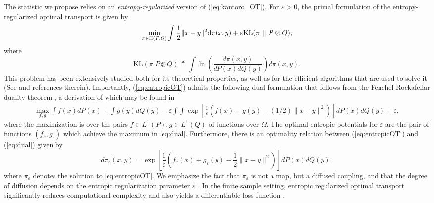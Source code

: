 \documentclass{article}
\theoremstyle{definition}
\newcommand{\feps}{f_\varepsilon}
\newcommand{\geps}{g_\varepsilon}
\begin{document}
The statistic we propose relies on an \textit{entropy-regularized} version of (\ref{eq:kantoro_OT}). For $\varepsilon>0$, the primal formulation of the entropy-regularized optimal transport is given by
\begin{equation}\label{eq:entropicOT}
    \min_{ \pi\in \Pi(P, Q)} \int \frac{1}{2}\|x-y\|^2 \text d\pi( x,  y) + \varepsilon \text{KL}( \pi \  || \ P \otimes Q),
\end{equation}
where
\begin{equation*}
    \text{KL}(\pi|P \otimes Q) \triangleq \int \ln \left ( \frac{d\pi( x, y)}{ dP(x) dQ( y)} \right ) d\pi( x, y).
\end{equation*}
This problem has been extensively studied both for its theoretical properties, as well as for the efficient algorithms that are used to solve it (See \cite{cuturi2013sinkhorn,peyre2019computational,genevay2016stochastic} and references therein).
Importantly, (\ref{eq:entropicOT}) admits the following dual formulation that follows from the Fenchel-Rockafellar duality theorem \cite{clason2021entropic}, a derivation of which may be found in \cite{genevay2019entropy, peyre2019computational}
\begin{align}\label{eq:dual}
    \max_{f, g} \int f(x)dP(x) + \int  g(y)dQ(y) -\varepsilon \int \int \exp\left [ \frac{1}{\varepsilon}\left ( f(x)+g(y)-(1/2)\|x-y\|^2 \right ) \right ] dP(x)dQ(y) + \varepsilon,
\end{align}
where the maximization is over the pairs $f \in L^1(P), g \in L^1(Q)$ of functions over $\Omega$.  The optimal entropic potentials for $\varepsilon$ are the pair of functions $(\feps, \geps)$ which achieve the maximum in  \eqref{eq:dual}. Furthermore, there is an optimality relation between (\ref{eq:entropicOT}) and (\ref{eq:dual}) given by
\begin{equation} \label{eq:opt_relation}
    d\pi_\varepsilon(x, y) = \exp\left [ \frac{1}{\varepsilon}\left ( \feps(x)+\geps(y)-\frac{1}{2}\|x-y\|^2 \right ) \right ] dP(x)dQ(y),
\end{equation}
where $\pi_\varepsilon$ denotes the solution to \eqref{eq:entropicOT}. We emphasize the fact that $\pi_\varepsilon$ is not a map, but a diffused coupling, and that the degree of diffusion depends on the entropic regularization parameter $\varepsilon$ \cite{peyre2019computational}.  In the finite sample setting, entropic regularized optimal transport significantly reduces computational complexity \cite{cuturi2013sinkhorn} and also yields a differentiable loss function \cite{schmitz2018wasserstein}.
\end{document}
